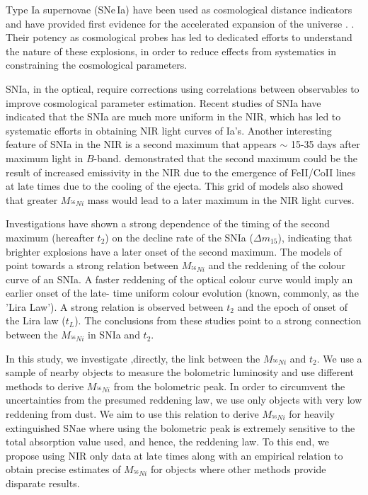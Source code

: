 \documentclass{aa}
\begin{document}
Type Ia supernovae (SNe\,Ia) have been used as cosmological distance indicators and have provided first evidence for the accelerated expansion of the universe \citep{Riess1998,Perlmutter1999}. . Their potency as cosmological probes has led to dedicated efforts to understand the nature of these explosions, in order to reduce effects from systematics in constraining  the cosmological parameters. 

SNIa, in the optical, require corrections using correlations between observables \citep{Phillips1993, Tripp1998} to improve cosmological parameter estimation. Recent studies of SNIa  have indicated that the SNIa are much more uniform in  
the NIR, which has led to systematic efforts in obtaining NIR light curves of Ia's. Another interesting feature of SNIa in the NIR is a second maximum that appears $\sim$ 15-35 days after maximum light in $B$-band.  \cite{Kasen2006} demonstrated that the
second maximum could be the result of increased emissivity in the NIR due to the emergence of FeII/CoII lines at late times due to the cooling of the ejecta.   
This grid of models also showed that greater $M_{^{56}Ni}$ mass would lead to a later maximum
in the NIR light curves.


Investigations have shown a strong dependence of the timing of the second maximum (hereafter $t_2$)
on the decline rate of the SNIa ($\Delta m_{15}$), indicating that brighter explosions have a later onset of the second maximum. The models of \cite{Kasen2007} point towards a strong relation between $M_{^{56}Ni}$ and the reddening of the colour curve of an SNIa. A faster reddening of the optical colour curve would imply an earlier onset of the late- time uniform colour evolution (known, commonly, as the 'Lira Law'). A strong relation is observed between $t_2$ and the epoch of onset of the Lira law ($t_L$). The conclusions from these studies point to a strong connection between 
the $M_{^{56}Ni}$ in SNIa and $t_2$. 

In this study, we investigate ,directly, the link between the  $M_{^{56}Ni}$ and $t_2$. We use a sample of nearby objects to measure the bolometric luminosity and use different methods to derive $M_{^{56}Ni}$ from the bolometric peak. In order to circumvent the uncertainties from the presumed reddening law, we use only objects with very low reddening from dust. We aim to use this relation to derive $M_{^{56}Ni}$ for heavily extinguished SNae where using the bolometric peak is extremely sensitive to the 
total absorption value used, and hence, the reddening law. To this end, we propose using NIR only data at late times along with an empirical relation to obtain precise 
estimates of $M_{^{56}Ni}$ for objects where other methods provide disparate results. 
\end{document}
